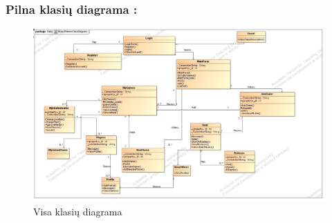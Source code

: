 \documentclass{VUMIFPSkursinis}
\begin{document}
		\subsubsection*{Pilna klasių diagrama :}
			\begin{figure}[H]
				\centering
				\includegraphics[scale=0.3]{img/BoardGamesClassDiagramFull}
				\caption{Visa klasių diagrama}
				\label{img:BoardGamesClassDiagramFull}
			\end{figure}
\end{document}
